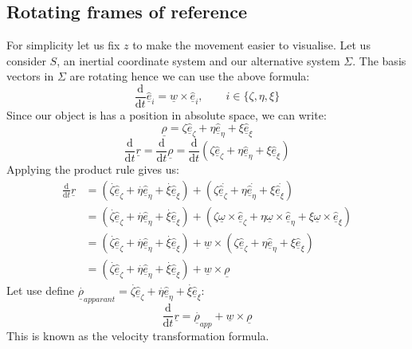 \documentclass[12pt]{article}
\newcommand{\uvec}[1]{\underline{\hat{#1}}}
\newcommand{\bvec}[1]{\uvec{e}_#1}
\newcommand{\df}[2]{\frac{\text{d}#1}{\text{d}#2}}
\begin{document}
\subsection*{Rotating frames of reference}
For simplicity let us fix \(z\) to make the movement easier to visualise. Let us consider \(S\), an inertial coordinate system and our alternative system \(\Sigma\). The basis vectors in \(\Sigma\) are rotating hence we can use the above formula:
\[\frac{\text{d}}{\text{d}t}\bvec{i}=\underline{w}\times\bvec{i},\qquad i\in\{\zeta,\eta,\xi\}\]
Since our object is has a position in absolute space, we can write:
\[\underline{\rho}=\zeta\bvec{\zeta}+\eta\bvec{\eta}+\xi\bvec{\xi}\]
\[\df{}{t}\underline{r}=\df{}{t}\underline{\rho}=\df{}{t}\left(\zeta\bvec{\zeta}+\eta\bvec{\eta}+\xi\bvec{\xi}\right)\]
Applying the product rule gives us:
\begin{align*}
    \df{}{t}\underline{r}&=\left(\overset{.}{\zeta}\bvec{\zeta}+\overset{.}{\eta}\bvec{\eta}+\overset{.}{\xi}\bvec{\xi}\right)+\left(\zeta\overset{.}{\bvec{\zeta}}+\eta\overset{.}{\bvec{\eta}}+\xi\overset{.}{\bvec{\xi}}\right) \\
    &=\left(\overset{.}{\zeta}\bvec{\zeta}+\overset{.}{\eta}\bvec{\eta}+\overset{.}{\xi}\bvec{\xi}\right)+\left(\zeta\underline{\omega}\times\bvec{\zeta}+\eta\underline{\omega}\times\bvec{\eta}+\xi\underline{\omega}\times\bvec{\xi}\right) \\
    &=\left(\overset{.}{\zeta}\bvec{\zeta}+\overset{.}{\eta}\bvec{\eta}+\overset{.}{\xi}\bvec{\xi}\right)+\underline{w}\times\left(\zeta\bvec{\zeta}+\eta\bvec{\eta}+\xi\bvec{\xi}\right) \\
    &=\left(\overset{.}{\zeta}\bvec{\zeta}+\overset{.}{\eta}\bvec{\eta}+\overset{.}{\xi}\bvec{\xi}\right)+\underline{w}\times\underline{\rho}
\end{align*}
Let use define \(\overset{.}{\underline{\rho}}_{apparant}=\overset{.}{\zeta}\bvec{\zeta}+\overset{.}{\eta}\bvec{\eta}+\overset{.}{\xi}\bvec{\xi}\):
\[\df{}{t}\underline{r}=\overset{.}{\underline{\rho}}_{app}+\underline{w}\times\underline{\rho}\]
This is known as the velocity transformation formula.
\end{document}
